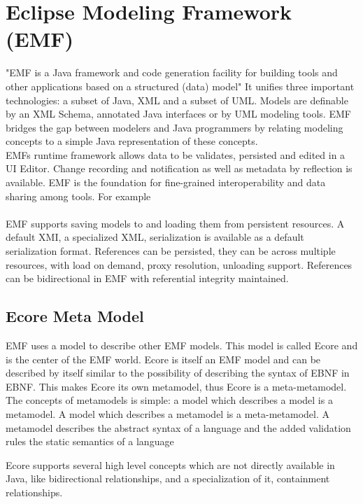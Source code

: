 \chapter{Eclipse Modeling Framework (EMF)}
"EMF is a Java framework and code generation facility for building tools and other applications based on a structured (data) model"\cite{EMFDoc}
 It unifies three important technologies: a subset of Java, XML and a subset of UML. Models are definable by an XML Schema, annotated Java interfaces or by UML modeling tools. EMF bridges the gap between modelers and Java programmers by relating modeling concepts to a simple Java representation of these concepts.\cite{EMF2nd}\\

EMFs runtime framework allows data to be validates, persisted and edited in a UI Editor. Change recording and notification as well as metadata by reflection is available. EMF is the foundation for fine-grained interoperability and data sharing among tools. For example 
\\ \\

EMF supports saving models to and loading them from persistent resources. A default XMI, a specialized XML, serialization is available as a default serialization format. References can be persisted, they can be across multiple resources, with load on demand, proxy resolution, unloading support. References can be bidirectional in EMF with referential integrity maintained. \cite{EMF2nd}\\

\section{Ecore Meta Model}
EMF uses a model to describe other EMF models. This model is called Ecore and is the center of the EMF world. Ecore is itself an EMF model and can be described by itself similar to the possibility of describing the syntax of EBNF in EBNF. This makes Ecore its own metamodel, thus Ecore is a meta-metamodel. The concepts of metamodels is simple: a model which describes a model is a metamodel. A model which describes a metamodel is a meta-metamodel. \cite{EMF2nd}  A metamodel describes the abstract syntax of a language \cite{EMP} and the added validation rules the static semantics of a language \cite{MDSD}

Ecore supports several high level concepts which are not directly available in Java, like bidirectional relationships, and a specialization of it, containment relationships.

